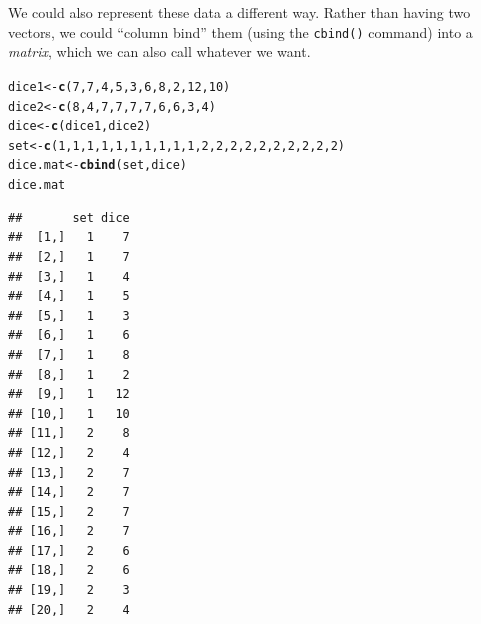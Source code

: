 \documentclass[12pt]{article}\usepackage[]{graphicx}\usepackage[]{color}
\makeatletter
\newcommand{\hlnum}[1]{\textcolor[rgb]{0.686,0.059,0.569}{#1}}%
\newcommand{\hlstd}[1]{\textcolor[rgb]{0.345,0.345,0.345}{#1}}%
\newcommand{\hlkwb}[1]{\textcolor[rgb]{0.69,0.353,0.396}{#1}}%
\newcommand{\hlkwd}[1]{\textcolor[rgb]{0.737,0.353,0.396}{\textbf{#1}}}%
\newenvironment{kframe}{%
 \def\at@end@of@kframe{}%
 \ifinner\ifhmode%
  \def\at@end@of@kframe{\end{minipage}}%
  \begin{minipage}{\columnwidth}%
 \fi\fi%
 \def\FrameCommand##1{\hskip\@totalleftmargin \hskip-\fboxsep
 \colorbox{shadecolor}{##1}\hskip-\fboxsep
     \hskip-\linewidth \hskip-\@totalleftmargin \hskip\columnwidth}%
 \MakeFramed {\advance\hsize-\width
   \@totalleftmargin\z@ \linewidth\hsize
   \@setminipage}}%
 {\par\unskip\endMakeFramed%
 \at@end@of@kframe}
\newenvironment{knitrout}{}{} %
\makeatother
\begin{document}
We could also represent these data a different way. Rather than having two vectors, we could ``column bind'' them (using the \texttt{cbind()} command) into a \emph{matrix}, which we can also call whatever we want.
\begin{knitrout}
\color{fgcolor}\begin{kframe}
\begin{alltt}
\hlstd{dice1} \hlkwb{<-} \hlkwd{c}\hlstd{(}\hlnum{7}\hlstd{,}\hlnum{7}\hlstd{,}\hlnum{4}\hlstd{,}\hlnum{5}\hlstd{,}\hlnum{3}\hlstd{,}\hlnum{6}\hlstd{,}\hlnum{8}\hlstd{,}\hlnum{2}\hlstd{,}\hlnum{12}\hlstd{,}\hlnum{10}\hlstd{)}
\hlstd{dice2} \hlkwb{<-} \hlkwd{c}\hlstd{(}\hlnum{8}\hlstd{,}\hlnum{4}\hlstd{,}\hlnum{7}\hlstd{,}\hlnum{7}\hlstd{,}\hlnum{7}\hlstd{,}\hlnum{7}\hlstd{,}\hlnum{6}\hlstd{,}\hlnum{6}\hlstd{,}\hlnum{3}\hlstd{,}\hlnum{4}\hlstd{)}
\hlstd{dice} \hlkwb{<-} \hlkwd{c}\hlstd{(dice1,dice2)}
\hlstd{set} \hlkwb{<-} \hlkwd{c}\hlstd{(}\hlnum{1}\hlstd{,}\hlnum{1}\hlstd{,}\hlnum{1}\hlstd{,}\hlnum{1}\hlstd{,}\hlnum{1}\hlstd{,}\hlnum{1}\hlstd{,}\hlnum{1}\hlstd{,}\hlnum{1}\hlstd{,}\hlnum{1}\hlstd{,}\hlnum{1}\hlstd{,}\hlnum{2}\hlstd{,}\hlnum{2}\hlstd{,}\hlnum{2}\hlstd{,}\hlnum{2}\hlstd{,}\hlnum{2}\hlstd{,}\hlnum{2}\hlstd{,}\hlnum{2}\hlstd{,}\hlnum{2}\hlstd{,}\hlnum{2}\hlstd{,}\hlnum{2}\hlstd{)}
\hlstd{dice.mat} \hlkwb{<-} \hlkwd{cbind}\hlstd{(set,dice)}
\hlstd{dice.mat}
\end{alltt}
\begin{verbatim}
##       set dice
##  [1,]   1    7
##  [2,]   1    7
##  [3,]   1    4
##  [4,]   1    5
##  [5,]   1    3
##  [6,]   1    6
##  [7,]   1    8
##  [8,]   1    2
##  [9,]   1   12
## [10,]   1   10
## [11,]   2    8
## [12,]   2    4
## [13,]   2    7
## [14,]   2    7
## [15,]   2    7
## [16,]   2    7
## [17,]   2    6
## [18,]   2    6
## [19,]   2    3
## [20,]   2    4
\end{verbatim}
\end{kframe}
\end{knitrout}
\end{document}
